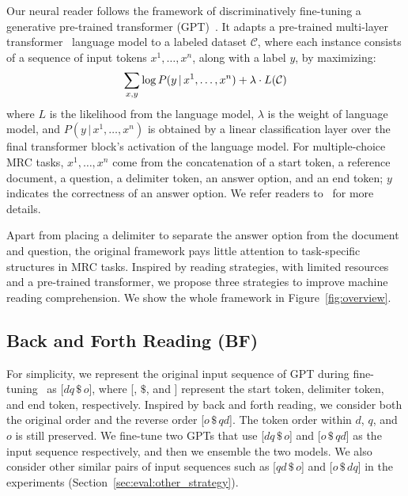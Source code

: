 \documentclass[11pt,a4paper]{article}
\begin{document}
Our neural reader follows the framework of discriminatively fine-tuning a generative pre-trained transformer (GPT)~\cite{radfordimproving}. It adapts a pre-trained multi-layer transformer~\cite{vaswani2017attention,liu2018generating} language model to a labeled dataset $\mathcal{C}$, where each instance consists of a sequence of input tokens $x^1,\ldots,x^n$, along with a label $y$, by maximizing:
\begin{equation}
\small
\sum_{x,y} \log P (y\, | \,x^1,\ldots,x^n) + \lambda \cdot L(\mathcal{C})
\end{equation}
where $L$ is the likelihood from the language model, $\lambda$ is the weight of language model, and $P (y \, | \,  x^1,\ldots,x^n)$ is obtained by a linear classification layer over the final transformer block's activation of the language model. For multiple-choice MRC tasks, $x^1,\ldots,x^n$ come from the concatenation of a start token, a reference document, a question, a delimiter token, an answer option, and an end token; $y$ indicates the correctness of an answer option. We refer readers to~ for more details.



Apart from placing a delimiter to separate the answer option from the document and question, the original framework pays little attention to task-specific structures in MRC tasks. Inspired by reading strategies, with limited resources and a pre-trained transformer, we propose three strategies to improve machine reading comprehension. We show the whole framework in Figure~\ref{fig:overview}. 










 \subsection{Back and Forth Reading (BF)}
\label{sec:fb}



For simplicity, we represent the original input sequence of GPT during fine-tuning~\cite{radfordimproving} as [$dq \, \$ \, o$], where [, $\$$, and ] represent the start token, delimiter token, and end token, respectively. Inspired by back and forth reading, we consider both the original order and the reverse order [$o  \, \$\, qd$]. The token order within $d$, $q$, and $o$ is still preserved. We fine-tune two GPTs that use [$dq \, \$\, o$] and [$o  \, \$\, qd$] as the input sequence respectively, and then we ensemble the two models. We also consider other similar pairs of input sequences such as [$qd\, \$\,o$] and [$o\, \$\,dq$] in the experiments (Section~\ref{sec:eval:other_strategy}).
\end{document}
